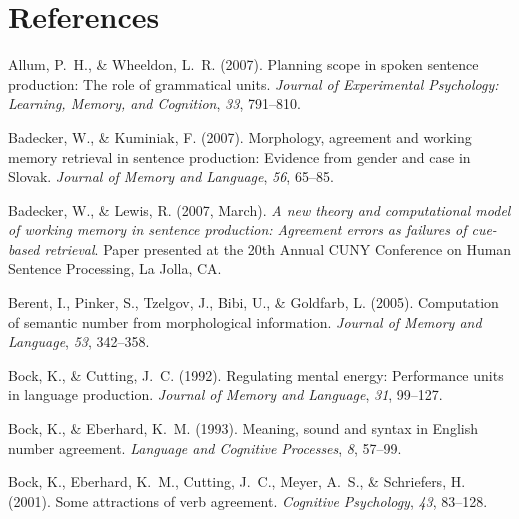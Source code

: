\documentclass[12pt,titlepage]{article}
\newcommand{\itt}{\textit}  %
\begin{document}
\clearpage

\section[References]{\center References}

\begin{description}

    \item Allum, P.~H., \& Wheeldon, L.~R\@.  (2007).  Planning scope in
    spoken sentence production: The role of grammatical units.
    \itt{Journal of Experimental Psychology: Learning, Memory, and
    Cognition}, \itt{33}, 791--810.
    
    \item Badecker, W., \& Kuminiak, F\@.  (2007).  Morphology, agreement
    and working memory retrieval in sentence production: Evidence from
    gender and case in Slovak.  \itt{Journal of Memory and Language},
    \itt{56}, 65--85.
    
    \item Badecker, W., \& Lewis, R\@.  (2007, March).  \itt{A new theory
    and computational model of working memory in sentence production:
    Agreement errors as failures of cue-based retrieval}.  Paper presented
    at the 20th Annual CUNY Conference on Human Sentence Processing, La
    Jolla, CA.

% 
    \item Berent, I., Pinker, S., Tzelgov, J., Bibi, U., \& Goldfarb, L\@.
    (2005).  Computation of semantic number from morphological information.
    \itt{Journal of Memory and Language}, \itt{53}, 342--358.
    
    \item Bock, K., \& Cutting, J.~C\@.  (1992).  Regulating mental energy:
    Performance units in language production.  \itt{Journal of Memory and
    Language}, \itt{31}, 99--127.

    \item Bock, K., \& Eberhard, K.~M\@.  (1993).  Meaning, sound and
    syntax in English number agreement.  \itt{Language and Cognitive
    Processes}, \itt{8}, 57--99.

    \item Bock, K., Eberhard, K.~M., Cutting, J.~C., Meyer, A.~S., \&
    Schriefers, H\@.  (2001).  Some attractions of verb agreement.
    \itt{Cognitive Psychology}, \itt{43}, 83--128.


\end{description}
\end{document}
